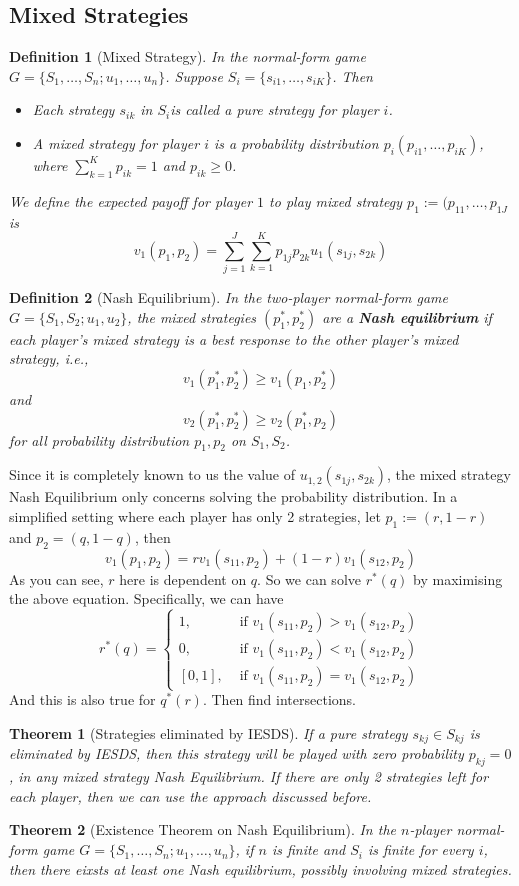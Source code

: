 \documentclass[12pt]{article}
\newtheorem{definition}{Definition}[section]
\newtheorem{theorem}{Theorem}[section]
\theoremstyle{definition}
\begin{document}
\subsection{Mixed Strategies}
\begin{definition}[Mixed Strategy]
\normalfont In the normal-form game $G=\{S_1,\ldots, S_n; u_1,\ldots, u_n\}$. Suppose $S_i=\{s_{i1}, \ldots, s_{iK}\}$. Then
\begin{itemize}
  \item Each strategy $s_{ik}$ in $S_i$is called a pure strategy for player $i$.
  \item A mixed strategy for player $i$ is a probability distribution $p_i(p_{i1}, \ldots, p_{iK})$, where $\sum_{k=1}^K p_{ik}=1$ and $p_{ik}\geq 0$.
\end{itemize}
We define the expected payoff for player $1$ to play mixed strategy $p_1:=(p_{11}, \ldots, p_{1J}$ is
\[
v_1(p_1,p_2)=\sum_{j=1}^J \sum_{k=1}^K p_{1j}p_{2k}u_1(s_{1j}, s_{2k})
\]
\end{definition}
\begin{definition}[Nash Equilibrium]
\normalfont In the two-player normal-form game $G=\{S_1,S_2; u_1,u_2\}$, the mixed strategies $(p_1^\ast, p_2^\ast)$ are a \textbf{Nash equilibrium} if each player's mixed strategy is a best response to the other player's mixed strategy, i.e.,
\[
v_1(p_1^\ast, p_2^\ast)\geq v_1(p_1, p_2^\ast)
\]
and 
\[
v_2(p_1^\ast, p_2^\ast)\geq v_2(p_1^\ast, p_2)
\]
for all probability distribution $p_1, p_2$ on $S_1, S_2$.
\end{definition}
Since it is completely known to us the value of $u_{1,2}(s_{1j}, s_{2k})$, the mixed strategy Nash Equilibrium only concerns solving the probability distribution. In a simplified setting where each player has only 2 strategies, let $p_1:=(r, 1-r)$ and $p_2=(q, 1-q)$, then 
\[
v_1(p_1, p_2)=rv_1(s_{11}, p_2)+(1-r)v_1(s_{12}, p_2)
\]
As you can see, $r$ here is dependent on $q$. So we can solve $r^\ast(q)$ by maximising the above equation. Specifically, we can have
\[
r^\ast(q)=\begin{cases}
1, &\text{ if }v_1(s_{11}, p_2)>v_1(s_{12}, p_2)\\
0, &\text{ if }v_1(s_{11}, p_2)<v_1(s_{12}, p_2)\\
[0,1], &\text{ if }v_1(s_{11}, p_2)=v_1(s_{12}, p_2)
\end{cases}
\]
And this is also true for $q^\ast(r)$. Then find intersections.
\begin{theorem}[Strategies eliminated by IESDS]
\normalfont If a pure strategy $s_{kj}\in S_{kj}$ is eliminated by IESDS, then this strategy will be played with zero probability $p_{kj}=0$, in any mixed strategy Nash Equilibrium. If there are only 2 strategies left for each player, then we can use the approach discussed before.
\end{theorem}
\begin{theorem}[Existence Theorem on Nash Equilibrium]
\normalfont In the $n$-player normal-form game $G=\{S_1,\ldots, S_n; u_1,\ldots, u_n\}$, if $n$ is \textit{finite} and $S_i$ is \textit{finite} for every $i$, then there eixsts at least one Nash equilibrium, possibly involving mixed strategies.
\end{theorem}
\end{document}
